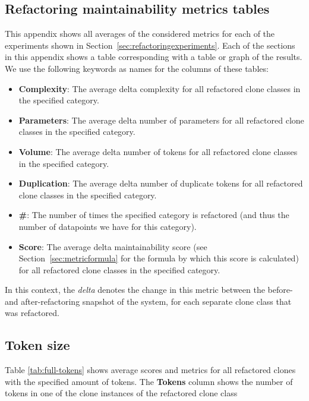 \begin{appendices}

	\chapter{Refactoring maintainability metrics tables}
	This appendix shows all averages of the considered metrics for each of the experiments shown in Section~\ref{sec:refactoringexperiments}. Each of the sections in this appendix shows a table corresponding with a table or graph of the results.	We use the following keywords as names for the columns of these tables:
	\begin{itemize}
		\item \textbf{Complexity}: The average delta complexity for all refactored clone classes in the specified category.
		\item \textbf{Parameters}: The average delta number of parameters for all refactored clone classes in the specified category.
		\item \textbf{Volume}: The average delta number of tokens for all refactored clone classes in the specified category.
		\item \textbf{Duplication}: The average delta number of duplicate tokens for all refactored clone classes in the specified category.
		\item \textbf{\#}: The number of times the specified category is refactored (and thus the number of datapoints we have for this category).
		\item \textbf{Score}: The average delta maintainability score (see Section~\ref{sec:metricformula} for the formula by which this score is calculated) for all refactored clone classes in the specified category.
	\end{itemize}
	In this context, the \textit{delta} denotes the change in this metric between the before- and after-refactoring snapshot of the system, for each separate clone class that was refactored.

	\section{Token size}
Table \ref{tab:full-tokens} shows average scores and metrics for all refactored clones with the specified amount of tokens. The \textbf{Tokens} column shows the number of tokens in one of the clone instances of the refactored clone class


\end{appendices}
